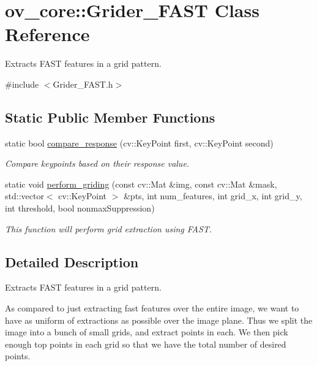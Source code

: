 \hypertarget{classov__core_1_1Grider__FAST}{}\section{ov\+\_\+core\+:\+:Grider\+\_\+\+F\+A\+ST Class Reference}
\label{classov__core_1_1Grider__FAST}


Extracts F\+A\+ST features in a grid pattern.  




{\ttfamily \#include $<$Grider\+\_\+\+F\+A\+S\+T.\+h$>$}

\subsection*{Static Public Member Functions}
\begin{DoxyCompactItemize}
\item 
static bool \hyperlink{classov__core_1_1Grider__FAST_a62a844fcba586eb31998ecf467634d6e}{compare\+\_\+response} (cv\+::\+Key\+Point first, cv\+::\+Key\+Point second)
\begin{DoxyCompactList}\small\item\em Compare keypoints based on their response value. \end{DoxyCompactList}\item 
static void \hyperlink{classov__core_1_1Grider__FAST_a36acfad18dc36878776dd4fa21165eac}{perform\+\_\+griding} (const cv\+::\+Mat \&img, const cv\+::\+Mat \&mask, std\+::vector$<$ cv\+::\+Key\+Point $>$ \&pts, int num\+\_\+features, int grid\+\_\+x, int grid\+\_\+y, int threshold, bool nonmax\+Suppression)
\begin{DoxyCompactList}\small\item\em This function will perform grid extraction using F\+A\+ST. \end{DoxyCompactList}\end{DoxyCompactItemize}


\subsection{Detailed Description}
Extracts F\+A\+ST features in a grid pattern. 

As compared to just extracting fast features over the entire image, we want to have as uniform of extractions as possible over the image plane. Thus we split the image into a bunch of small grids, and extract points in each. We then pick enough top points in each grid so that we have the total number of desired points. 

